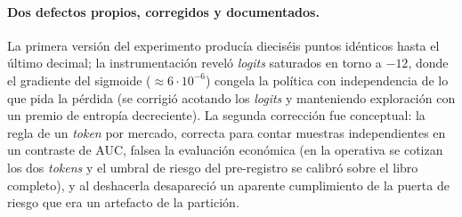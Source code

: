 \paragraph{Dos defectos propios, corregidos y documentados.} La primera versión del
experimento producía dieciséis puntos idénticos hasta el último decimal; la
instrumentación reveló \emph{logits} saturados en torno a $-12$, donde el gradiente del
sigmoide ($\approx 6\cdot10^{-6}$) congela la política con independencia de lo que pida la
pérdida (se corrigió acotando los \emph{logits} y manteniendo exploración con un premio de
entropía decreciente). La segunda corrección fue conceptual: la regla de un \emph{token}
por mercado, correcta para contar muestras independientes en un contraste de AUC, falsea
la evaluación económica (en la operativa se cotizan los dos \emph{tokens} y el umbral de
riesgo del pre-registro se calibró sobre el libro completo), y al deshacerla desapareció
un aparente cumplimiento de la puerta de riesgo que era un artefacto de la partición.
